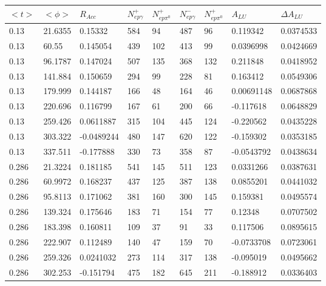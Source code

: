 \documentclass[12pt]{article}
\begin{document}
\begin{table}[!h]
   \begin{center}
      \begin{tabular}{||l|l|l|l|l|l|l|l|l||}
         \hline

$<t>$ & $<\phi>$ &$R_{Acc}$    &$N^{+}_{ep\gamma}$    &$N^{+}_{ep\pi^{0}}$   &$N^{-}_{ep\gamma}$   &$N^{+}_{ep\pi^{0}}$    &$A_{LU}$    &$\Delta A_{LU}$\\
\hline
\hline
0.13    &21.6355    &0.15332    &584    &94   &487   &96    &0.119342    &0.0374533\\
0.13    &60.55    &0.145054    &439    &102   &413   &99    &0.0396998    &0.0424669\\
0.13    &96.1787    &0.147024    &507    &135   &368   &132    &0.211848    &0.0418952\\
0.13    &141.884    &0.150659    &294    &99   &228   &81    &0.163412    &0.0549306\\
0.13    &179.999    &0.144187    &166    &48   &164   &46    &0.00691148    &0.0687868\\
0.13    &220.696    &0.116799    &167    &61   &200   &66    &-0.117618    &0.0648829\\
0.13    &259.426    &0.0611887    &315    &104   &445   &124    &-0.220562    &0.0435228\\
0.13    &303.322    &-0.0489244    &480    &147   &620   &122    &-0.159302    &0.0353185\\
0.13    &337.511    &-0.177888    &330    &73   &358   &87    &-0.0543792    &0.0438634\\
\hline
0.286    &21.3224    &0.181185    &541    &145   &511   &123    &0.0331266    &0.0387631\\
0.286    &60.9972    &0.168237    &437    &125   &387   &138    &0.0855201    &0.0441032\\
0.286    &95.8113    &0.171062    &381    &160   &300   &145    &0.159381    &0.0495574\\
0.286    &139.324    &0.175646    &183    &71   &154   &77    &0.12348    &0.0707502\\
0.286    &183.398    &0.160811    &109    &37   &91   &33    &0.117506    &0.0895615\\
0.286    &222.907    &0.112489    &140    &47   &159   &70    &-0.0733708    &0.0723061\\
0.286    &259.326    &0.0241032    &273    &114   &317   &138    &-0.095019    &0.0495662\\
0.286    &302.253    &-0.151794    &475    &182   &645   &211    &-0.188912    &0.0336403\\

\end{tabular}
\end{center}
\end{table}
\end{document}
